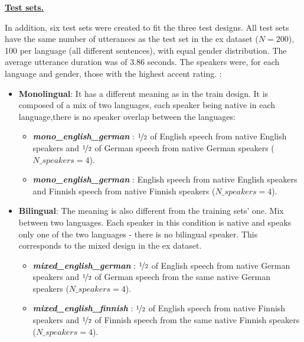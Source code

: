\par \noindent \textbf{\underline{Test sets.}}

\smallskip

\par \noindent In addition, six test sets were created to fit the three test designs. All test sets have the same number of utterances as the test set in the \acrshort{ex} dataset ($N=200$), 100 per language (all different sentences), with equal gender distribution. The average utterance duration was of 3.86 seconds. The speakers were, for each language and gender, those with the highest accent rating. :
\begin{itemize}[itemsep=2pt,topsep=4pt,itemindent=4pt]
    \renewcommand\labelitemi{$\ast$}
    \item \textbf{Monolingual}: It has a different meaning as in the train design. It is composed of a mix of two languages, each speaker being native in each language,there is no speaker overlap between the languages:
        \begin{itemize}[itemsep=1pt,topsep=2pt]
        \renewcommand\labelitemi{--}
        \item \textbf{\textit{mono\_english\_german}} : $\nicefrac{1}{2}$ of English speech from native English speakers and $\nicefrac{1}{2}$ of German speech from native German speakers ($N\_speakers=4$).
        \item \textbf{\textit{mono\_english\_german}} : English speech from native English speakers and Finnish speech from native Finnish speakers ($N\_speakers=4$). 
        \end{itemize}
    \item \textbf{Bilingual}: The meaning is also different from the training sets' one. Mix between two languages. Each speaker in this condition is native and speaks only one of the two languages - there is no bilingual speaker. This corresponds to the mixed design in the \acrshort{ex} dataset. 
        \begin{itemize}[itemsep=1pt,topsep=2pt]
        \renewcommand\labelitemi{--}
        \item \textbf{\textit{mixed\_english\_german}} : $\nicefrac{1}{2}$ of English speech from native German speakers and $\nicefrac{1}{2}$ of German speech from the same native German speakers ($N\_speakers=4$). 
        \item \textbf{\textit{mixed\_english\_finnish}} : $\nicefrac{1}{2}$ of English speech from native Finnish speakers and $\nicefrac{1}{2}$ of Finnish speech from the same native Finnish speakers ($N\_speakers=4$).

\end{itemize}
\end{itemize}
